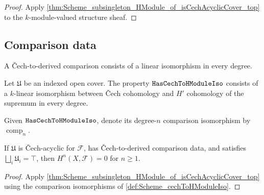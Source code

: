 \begin{proof}


\leanok
  Apply \cref{thm:Scheme_subsingleton_HModule_of_isCechAcyclicCover_top} to the \(k\)-module-valued structure sheaf.
\end{proof}

\subsection{Comparison data}

A \v{C}ech-to-derived comparison consists of a linear isomorphism in every degree.

\begin{definition}\leanok
  \label{def:Scheme_HasCechToHModuleIso}

  Let \(\mathfrak U\) be an indexed open cover. The property \(\mathtt{HasCechToHModuleIso}\) consists of a \(k\)-linear isomorphism between \v{C}ech cohomology and \(H'\) cohomology of the supremum in every degree.
\end{definition}

\begin{definition}\leanok
  \label{def:Scheme_cechToHModuleIso}

  Given \(\mathtt{HasCechToHModuleIso}\), denote its degree-\(n\) comparison isomorphism by \(\operatorname{comp}_n\).
\end{definition}

\begin{theorem}\leanok
  \label{thm:Scheme_subsingleton_HModule_of_hasCechToHModuleIso_top}

  If \(\mathfrak U\) is \v{C}ech-acyclic for \(\mathcal F\), has \v{C}ech-to-derived comparison data, and satisfies \(\bigsqcup_i\mathfrak U_i=\top\), then \(H^n(X,\mathcal F)=0\) for \(n\geq1\).
\end{theorem}

\begin{proof}


\leanok
  Apply \cref{thm:Scheme_subsingleton_HModule_of_isCechAcyclicCover_top} using the comparison isomorphisms of \cref{def:Scheme_cechToHModuleIso}.
\end{proof}

